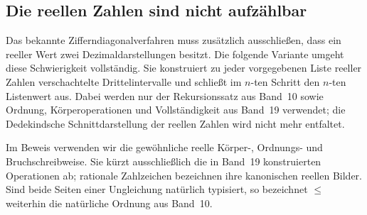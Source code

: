 \documentclass[main.tex]{subfiles}
\begin{document}
\subsection{Die reellen Zahlen sind nicht aufzählbar}

Das bekannte Zifferndiagonalverfahren muss zusätzlich ausschließen, dass ein
reeller Wert zwei Dezimaldarstellungen besitzt. Die folgende Variante umgeht
diese Schwierigkeit vollständig. Sie konstruiert zu jeder vorgegebenen Liste
reeller Zahlen verschachtelte Drittelintervalle und schließt im \(n\)-ten
Schritt den \(n\)-ten Listenwert aus. Dabei werden nur der Rekursionssatz aus
Band~10 sowie Ordnung, Körperoperationen und Vollständigkeit aus Band~19
verwendet; die Dedekindsche Schnittdarstellung der reellen Zahlen wird nicht
mehr entfaltet.

Im Beweis verwenden wir die gewöhnliche reelle Körper-, Ordnungs- und
Bruchschreibweise. Sie kürzt ausschließlich die in Band~19 konstruierten
Operationen ab; rationale Zahlzeichen bezeichnen ihre kanonischen reellen
Bilder. Sind beide Seiten einer Ungleichung natürlich typisiert, so bezeichnet
\(\leq\) weiterhin die natürliche Ordnung aus Band~10.
\end{document}
